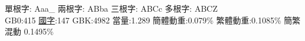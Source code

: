 \documentclass{ctexart}
\begin{document}
\begin{tblr}
    \end{tblr}

    \vspace{2mm}

        \fontsize{14pt}{14pt} \selectfont 

    \begin{multicols}{2}
        單根字: Aaa\_ 兩根字: ABba 三根字: ABCc 多根字: ABCZ \\
        GB0:415 \uline{國字}:147 GBK:4982 當量:1.289 簡體動重:0.079\% 繁體動重:0.1085\% 簡繁混動 0.1495\% \\
        \vspace{12pt}
    \vspace{12pt}
    \end{multicols}
\end{document}
